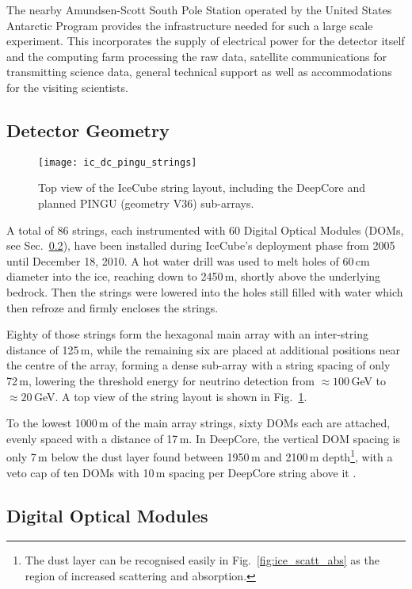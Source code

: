 The nearby Amundsen-Scott South Pole Station operated by the United States 
Antarctic Program provides the infrastructure needed for such a large scale 
experiment. This incorporates the supply of electrical power for the detector 
itself and the computing farm processing the raw data, satellite communications 
for transmitting science data, general technical support as well as 
accommodations for the visiting scientists.

\subsection{Detector Geometry}
\label{sec:ICgeometry}

\begin{figure}[thp]
 \centering
 \texttt{[image: ic\_dc\_pingu\_strings]}
 \caption{Top view of the IceCube string layout, including the DeepCore and
planned PINGU (geometry V36) sub-arrays.}
 \label{fig:string_layout}
\end{figure}

A total of 86 strings, each instrumented with 60 Digital Optical Modules (DOMs, 
see Sec.~\ref{sec:ICDOM}), have been installed during IceCube's deployment phase 
from 2005 until December 18, 2010. A hot water drill was used to melt holes of 
60\,cm diameter into the ice, reaching down to 2450\,m, shortly above the 
underlying bedrock. Then the strings were lowered into the holes still filled 
with water which then refroze and firmly encloses the strings.

Eighty of those strings form the hexagonal main array with an inter-string 
distance of 125\,m, while the remaining six are placed at additional positions 
near the centre of the array, forming a dense sub-array with a string spacing 
of only 72\,m, lowering the threshold energy for neutrino detection from 
$\approx 100$\,GeV to $\approx 20$\,GeV. A top view of the string layout is 
shown in Fig.~\ref{fig:string_layout}.

To the lowest 1000\,m of the main array strings, sixty DOMs each are attached, 
evenly spaced with a distance of 17\,m. In DeepCore, the vertical DOM spacing 
is only 7\,m below the dust layer found between 1950\,m and 2100\,m 
depth\footnote{The dust layer can be recognised easily in 
Fig.~\ref{fig:ice_scatt_abs} as the region of increased scattering and 
absorption.}, with a veto cap of ten DOMs with 10\,m spacing per DeepCore 
string above it \cite{I3Design,DCDesign}.


\subsection{Digital Optical Modules}
\label{sec:ICDOM}

